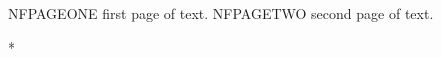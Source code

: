 \documentclass{autoexam}
\begin{document}
NFPAGEONE first page of text.
\newpage
NFPAGETWO second page of text.
\begin{problems}*
\end{problems}
\blankpage
\end{document}
